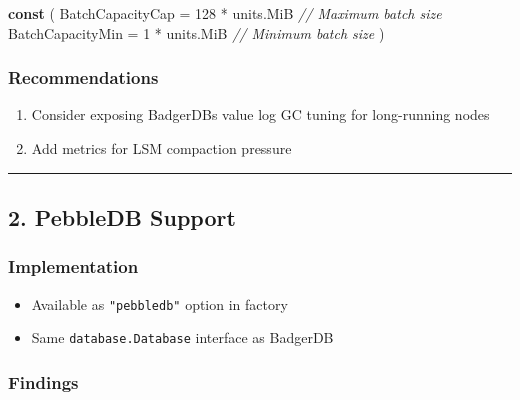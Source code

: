 \documentclass[
]{article}
\newenvironment{Shaded}{}{}
\newcommand{\CommentTok}[1]{\textcolor[rgb]{0.38,0.63,0.69}{\textit{#1}}}
\newcommand{\DecValTok}[1]{\textcolor[rgb]{0.25,0.63,0.44}{#1}}
\newcommand{\KeywordTok}[1]{\textcolor[rgb]{0.00,0.44,0.13}{\textbf{#1}}}
\newcommand{\NormalTok}[1]{#1}
\newcommand{\OperatorTok}[1]{\textcolor[rgb]{0.40,0.40,0.40}{#1}}
\providecommand{\tightlist}{%
  \setlength{\itemsep}{0pt}\setlength{\parskip}{0pt}}
\begin{document}
\begin{Shaded}
\begin{Highlighting}[]
\KeywordTok{const} \OperatorTok{(}
\NormalTok{    BatchCapacityCap }\OperatorTok{=} \DecValTok{128} \OperatorTok{*}\NormalTok{ units}\OperatorTok{.}\NormalTok{MiB  }\CommentTok{// Maximum batch size}
\NormalTok{    BatchCapacityMin }\OperatorTok{=} \DecValTok{1} \OperatorTok{*}\NormalTok{ units}\OperatorTok{.}\NormalTok{MiB    }\CommentTok{// Minimum batch size}
\OperatorTok{)}
\end{Highlighting}
\end{Shaded}

\subsubsection{Recommendations}\label{recommendations}

\begin{enumerate}
\def\labelenumi{\arabic{enumi}.}
\tightlist
\item
  Consider exposing BadgerDB\textquotesingle s value log GC tuning for
  long-running nodes
\item
  Add metrics for LSM compaction pressure
\end{enumerate}

\begin{center}\rule{0.5\linewidth}{0.5pt}\end{center}

\subsection{2. PebbleDB Support}\label{2-pebbledb-support}

\subsubsection{Implementation}\label{implementation-1}

\begin{itemize}
\tightlist
\item
  Available as \texttt{"pebbledb"} option in factory
\item
  Same \texttt{database.Database} interface as BadgerDB
\end{itemize}

\subsubsection{Findings}\label{findings-1}
\end{document}
